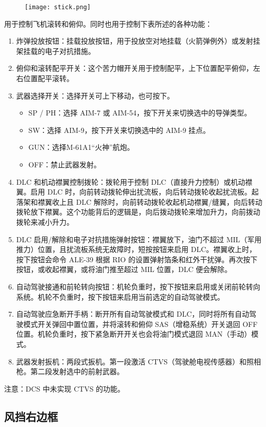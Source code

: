 \begin{figure}[htb]
	\centering
	\texttt{[image: stick.png]}
\end{figure}
用于控制飞机滚转和俯仰。同时也用于控制下表所述的各种功能：

\begin{enumerate}
	\item 炸弹投放按钮：挂载投放按钮，用于投放空对地挂载（火箭弹例外）或发射挂架挂载的电子对抗措施。
	\item 俯仰和滚转配平开关：这个苦力帽开关用于控制配平，上下位置配平俯仰，左右位置配平滚转。
	\item 武器选择开关：选择开关可上下移动，也可按下。
	      \begin{itemize}
		      \item SP / PH：选择 AIM-7 或 AIM-54，按下开关来切换选中的导弹类型。
		      \item SW：选择 AIM-9，按下开关来切换选中的 AIM-9 挂点。
		      \item GUN：选择M-61A1“火神”航炮。
		      \item OFF：禁止武器发射。
	      \end{itemize}
	\item DLC 和机动襟翼控制拨轮：拨轮用于控制 DLC（直接升力控制）或机动襟翼。启用 DLC 时，向前转动拨轮伸出扰流板，向后转动拨轮收起扰流板。起落架和襟翼收上且 DLC 解除时，向前转动拨轮收起机动襟翼/缝翼，向后转动拨轮放下襟翼。这个功能背后的逻辑是，向后拨动拨轮来增加升力，向前拨动拨轮来减小升力。
	\item DLC 启用/解除和电子对抗措施弹射按钮：襟翼放下，油门不超过 MIL（军用推力）位置，且扰流板系统无故障时，短按按钮来启用 DLC。襟翼收上时，按下按钮会命令 ALE-39 根据 RIO 的设置弹射箔条和红外干扰弹。再次按下按钮，或收起襟翼，或将油门推至超过 MIL 位置，DLC 便会解除。
	\item 自动驾驶接通和前轮转向按钮：机轮负重时，按下按钮来启用或关闭前轮转向系统。机轮不负重时，按下按钮来启用当前选定的自动驾驶模式。
	\item 自动驾驶应急断开手柄：断开所有自动驾驶模式和 DLC，同时将所有自动驾驶模式开关弹回中置位置，并将滚转和俯仰 SAS（增稳系统）开关退回 OFF 位置。机轮负重时，按下紧急断开开关也会将油门模式退回 MAN（手动）模式。
	\item 武器发射扳机：两段式扳机。第一段激活 CTVS（驾驶舱电视传感器）和照相枪。第二段发射选中的前射武器。
\end{enumerate}
注意：DCS 中未实现 CTVS 的功能。

\subsection{风挡右边框}

